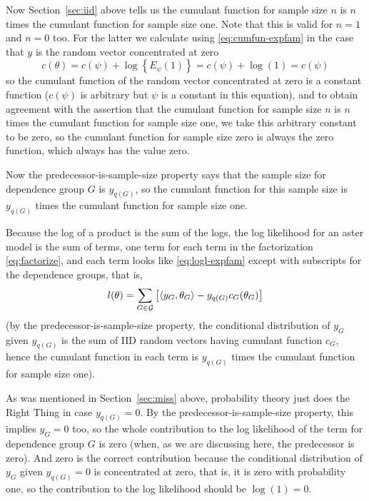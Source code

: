 Now Section~\ref{sec:iid} above tells us the cumulant function for sample
size $n$ is $n$ times the cumulant function for sample size one.
Note that this is valid for $n = 1$ and $n = 0$ too.
For the latter we calculate using \eqref{eq:cumfun-expfam} in the case
that $y$ is the random vector concentrated at zero
$$
   c(\theta) = c(\psi) + \log\left\{ E_\psi(1) \right\}
   = c(\psi) + \log(1)
   = c(\psi)
$$
so the cumulant function of the random vector concentrated at zero is
a constant function ($c(\psi)$ is arbitrary but $\psi$ is a constant
in this equation),
and to obtain agreement with the assertion that the cumulant function for
sample size $n$ is $n$ times the cumulant function for sample size one,
we take this arbitrary constant to be zero, so the cumulant function for
sample size zero is always the zero function, which always has the value zero.

Now the predecessor-is-sample-size property says that the sample size
for dependence group $G$ is $y_{q(G)}$, so the cumulant function for this
sample size is $y_{q(G)}$ times the cumulant function for sample size one.

Because the log of a product is the sum of the logs, the log likelihood
for an aster model is the sum of terms, one term for each term in the
factorization \eqref{eq:factorize}, and each term looks like
\eqref{eq:logl-expfam} except with subscripts for the dependence groups,
that is,
\begin{equation} \label{eq:logl-aster-theta}
   l(\theta)
   =
   \sum_{G \in \mathcal{G}}
   \left[ \langle y_G, \theta_G \rangle - y_{q(G)} c_G(\theta_G) \right]
\end{equation}
(by the predecessor-is-sample-size property, the conditional distribution
of $y_G$ given $y_{q(G)}$ is the sum of IID random vectors having cumulant
function $c_G$, hence the cumulant function in each term is $y_{q(G)}$
times the cumulant function for sample size one).

As was mentioned in Section~\ref{sec:miss} above, probability theory
just does the Right Thing in case $y_{q(G)} = 0$.
By the predecessor-is-sample-size property, this implies $y_G = 0$ too,
so the whole contribution to the log likelihood of the term for dependence
group $G$ is zero (when, as we are discussing here, the predecessor is zero).
And zero is the correct contribution because the conditional distribution
of $y_G$ given $y_{q(G)} = 0$ is concentrated at zero,
that is, it is zero with probability one, so the contribution to the
log likelihood should be $\log(1) = 0$.

